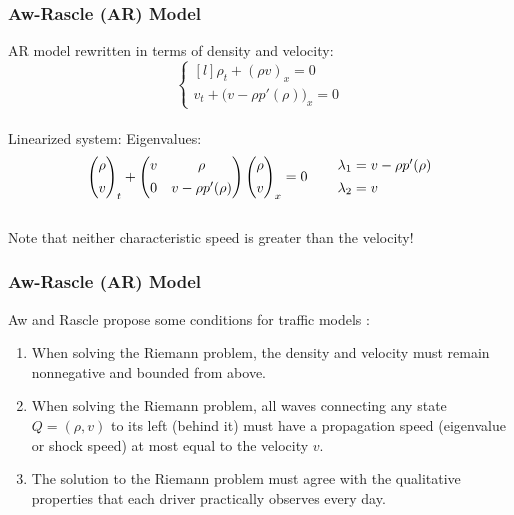 \documentclass{beamer}
\begin{document}
\begin{frame}
\frametitle{Aw-Rascle (AR) Model}

AR model rewritten in terms of density and velocity: \\[1ex]

\[ \left\{ \begin{matrix*}[l] \rho_t + (\rho v)_x = 0 \\[2ex] v_t + \Big( v - \rho p'(\rho) \Big)_x = 0 \end{matrix*} \right. \] \\[3ex]

\hspace{5em} Linearized system: \hspace{7em} Eigenvalues:
\[ \begin{pmatrix} \rho \\[1ex] v \end{pmatrix}_t + \begin{pmatrix} v & \rho \\[1ex] 0 & v - \rho p'(\rho)  \end{pmatrix} \begin{pmatrix} \rho \\[1ex] v \end{pmatrix}_x = 0 \hspace{5ex} \begin{matrix*}[l] \lambda_1 = v - \rho p'(\rho) \\[1ex] \lambda_2 = v \end{matrix*} \] \\[1ex]

Note that neither characteristic speed is greater than the velocity!

\end{frame}

\begin{frame}
\frametitle{Aw-Rascle (AR) Model}

Aw and Rascle propose some conditions for traffic models \cite{AwRascle2000}:
\begin{enumerate}
\item When solving the Riemann problem, the density and velocity must remain nonnegative and bounded from above.
\item When solving the Riemann problem, all waves connecting any state $Q = (\rho, v)$ to its left (behind it) must have a propagation speed (eigenvalue or shock speed) at most equal to the velocity $v$.  
\item The solution to the Riemann problem must agree with the qualitative properties that each driver practically observes every day.
\end{enumerate}

\end{frame}
\end{document}
